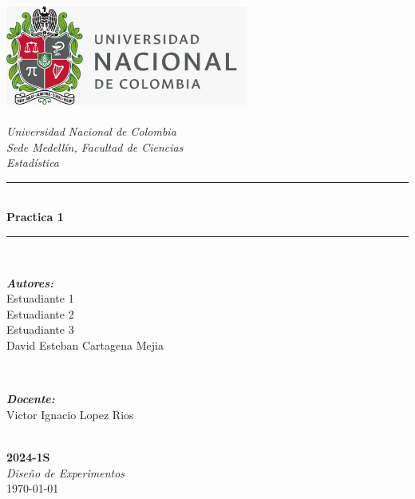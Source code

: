\begin{titlepage}
\newcommand{\HRule}{\rule{\linewidth}{0.5mm}}
\includegraphics[width=8cm]{Unal.jpeg}\\[0.5cm] 
\center 
\quad\\[1.0cm]
\textsl{\Large Universidad Nacional de Colombia}\\[0.5cm] 
\textsl{\large Sede Medellín, Facultad de Ciencias}\\[0.5cm] 
\textsl{\large Estadística}\\[1.5cm] 
\makeatletter
\HRule \\[0.6cm]
{ \huge \bfseries Practica 1}\\[0.4cm] 
\HRule \\[1.8cm]
\begin{minipage}{0.4\textwidth}
\begin{flushleft} \large
\emph{\textbf{Autores:}}\\
Estuadiante 1 \\
Estuadiante 2 \\
Estuadiante 3 \\
David Esteban Cartagena Mejia\\
\end{flushleft}
\end{minipage}
~
\begin{minipage}{0.4\textwidth}
\begin{flushright} \large
\emph{\textbf{Docente:}} \\
\textup{Victor Ignacio Lopez Rios}
\end{flushright}
\end{minipage}\\[3.2cm]
\makeatother
{\large \textbf{2024-1S}}\\[0.5cm]
{\large \emph{Diseño de Experimentos}}\\[0.6cm]
{\large \today}\\[2cm] 
\vfill 
\end{titlepage}